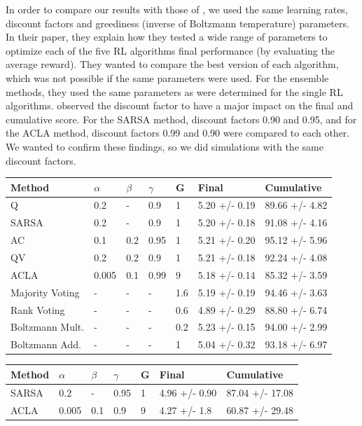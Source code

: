 \documentclass[letterpaper]{article}
\begin{document}
In order to compare our results with those of \cite{wiering2008}, we used
the same learning rates, discount factors and greediness (inverse of
Boltzmann temperature) parameters. In their paper, they explain how they
tested a wide range of parameters to optimize each of the five RL
algorithms final performance (by evaluating the average reward). They
wanted to compare the best version of each algorithm, which was not
possible if the same parameters were used. For the ensemble methods,
they used the same parameters as were determined for the single RL
algorithms. \cite{wiering2008} observed the discount factor to have a major
impact on the final and cumulative score. For the SARSA method, discount
factors 0.90 and 0.95, and for the ACLA method, discount factors 0.99
and 0.90 were compared to each other. We wanted to confirm these
findings, so we did simulations with the same discount factors.


\begin{table}
\centering
\begin{tabular}{|l|llllll|}
\hline
Method & \(\alpha\) & \(\beta\) & \(\gamma\) & G & Final &
Cumulative \\ \hline
Q & 0.2 & - & 0.9 & 1 & 5.20 +/- 0.19 & 89.66 +/- 4.82\\
SARSA & 0.2 & - & 0.9 & 1 & 5.20 +/- 0.18 & 91.08 +/-
4.16\\
AC & 0.1 & 0.2 & 0.95 & 1 & 5.21 +/- 0.20 & 95.12 +/-
5.96\\
QV & 0.2 & 0.2 & 0.9 & 1 & 5.21 +/- 0.18 & 92.24 +/- 4.08\\
ACLA & 0.005 & 0.1 & 0.99 & 9 & 5.18 +/- 0.14 & 85.32 +/-
3.59\\
Majority Voting & - & - & - & 1.6 & 5.19 +/- 0.19 & 94.46 +/-
3.63\\
Rank Voting & - & - & - & 0.6 & 4.89 +/- 0.29 & 88.80 +/-
6.74\\
Boltzmann Mult. & - & - & - & 0.2 & 5.23 +/- 0.15 & 94.00 +/-
2.99\\
Boltzmann Add. & - & - & - & 1 & 5.04 +/- 0.32 & 93.18 +/-
6.97\\ \hline
\end{tabular}
\end{table}

\begin{table}
\centering
\begin{tabular}{|l|llllll|}
\hline
Method & \(\alpha\) & \(\beta\) & \(\gamma\) & G & Final &
Cumulative  \\ \hline
SARSA & 0.2 & - & 0.95 & 1 & 4.96 +/- 0.90 & 87.04 +/-
17.08\\
ACLA & 0.005 & 0.1 & 0.9 & 9 & 4.27 +/- 1.8 & 60.87 +/-
29.48\\ \hline
\end{tabular}
\end{table}
\end{document}
